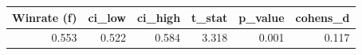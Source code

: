 \begin{tabular}{rrrrrr}
\toprule
Winrate (f) & ci\_low & ci\_high & t\_stat & p\_value & cohens\_d \\
\midrule
0.553 & 0.522 & 0.584 & 3.318 & 0.001 & 0.117 \\
\bottomrule
\end{tabular}
